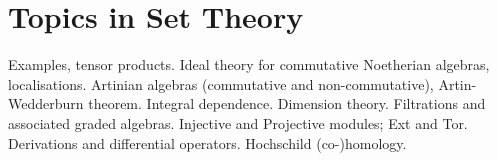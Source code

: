 \documentclass[main.tex]{subfiles}
\begin{document}
	\chapter{Topics in Set Theory}
Examples, tensor products. Ideal theory for commutative Noetherian algebras, localisations. Artinian
algebras (commutative and non-commutative), Artin-Wedderburn theorem. Integral dependence. Dimension theory. Filtrations and associated graded algebras. Injective and Projective modules; Ext and Tor.
Derivations and differential operators. Hochschild (co-)homology.
\end{document}
